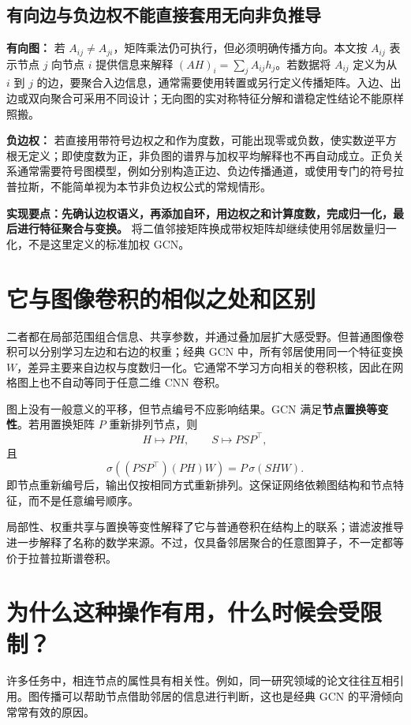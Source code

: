 \documentclass[UTF8,a4paper,11pt,fontset=fandol]{ctexart}
\begin{document}
\subsection{有向边与负边权不能直接套用无向非负推导}
\textbf{有向图：} 若 $A_{ij}\ne A_{ji}$，矩阵乘法仍可执行，但必须明确传播方向。本文按 $A_{ij}$ 表示节点 $j$ 向节点 $i$ 提供信息来解释 $(AH)_i=\sum_jA_{ij}h_j$。若数据将 $A_{ij}$ 定义为从 $i$ 到 $j$ 的边，要聚合入边信息，通常需要使用转置或另行定义传播矩阵。入边、出边或双向聚合可采用不同设计；无向图的实对称特征分解和谱稳定性结论不能原样照搬。

\textbf{负边权：} 若直接用带符号边权之和作为度数，可能出现零或负数，使实数逆平方根无定义；即使度数为正，非负图的谱界与加权平均解释也不再自动成立。正负关系通常需要符号图模型，例如分别构造正边、负边传播通道，或使用专门的符号拉普拉斯，不能简单视为本节非负边权公式的常规情形。

\textbf{实现要点：先确认边权语义，再添加自环，用边权之和计算度数，完成归一化，最后进行特征聚合与变换。} 将二值邻接矩阵换成带权矩阵却继续使用邻居数量归一化，不是这里定义的标准加权 GCN。

\section{它与图像卷积的相似之处和区别}
二者都在局部范围组合信息、共享参数，并通过叠加层扩大感受野。但普通图像卷积可以分别学习左边和右边的权重；经典 GCN 中，所有邻居使用同一个特征变换 $W$，差异主要来自边权与度数归一化。它通常不学习方向相关的卷积核，因此在网格图上也不自动等同于任意二维 CNN 卷积。

图上没有一般意义的平移，但节点编号不应影响结果。GCN 满足\textbf{节点置换等变性}。若用置换矩阵 $P$ 重新排列节点，则
\begin{equation}
H\mapsto PH,\qquad S\mapsto PSP^\top,
\end{equation}
且
\begin{equation}
\sigma\!\left((PSP^\top)(PH)W\right)
=P\,\sigma(SHW).
\end{equation}
即节点重新编号后，输出仅按相同方式重新排列。这保证网络依赖图结构和节点特征，而不是任意编号顺序。

局部性、权重共享与置换等变性解释了它与普通卷积在结构上的联系；谱滤波推导进一步解释了名称的数学来源。不过，仅具备邻居聚合的任意图算子，不一定都等价于拉普拉斯谱卷积。

\section{为什么这种操作有用，什么时候会受限制？}
许多任务中，相连节点的属性具有相关性。例如，同一研究领域的论文往往互相引用。图传播可以帮助节点借助邻居的信息进行判断，这也是经典 GCN 的平滑倾向常常有效的原因。
\end{document}
